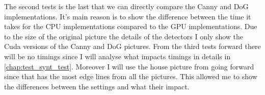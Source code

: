 \begin{table}[H]
\centering
{}
\caption{Timings of the second test for real pictures}
\label{tab:test2c}
\end{table}

The second tests is the last that we can directly compare the \ac{Canny} and \ac{DoG} implementations. It's main reason is to show the difference between the time it takes for the \ac{CPU} implementations compared to the \ac{GPU} implementations. Due to the size of the original picture the details of the detectors I only show the Cuda versions of the \ac{Canny} and \ac{DoG} pictures. From the third tests forward there will be no timings since I will analyse what impacts timings in details in \autoref{chap:test_synt_test}. Moreover I will use the house picture from going forward since that has the most edge lines from all the pictures. This allowed me to show the differences between the settings and what their impact.

